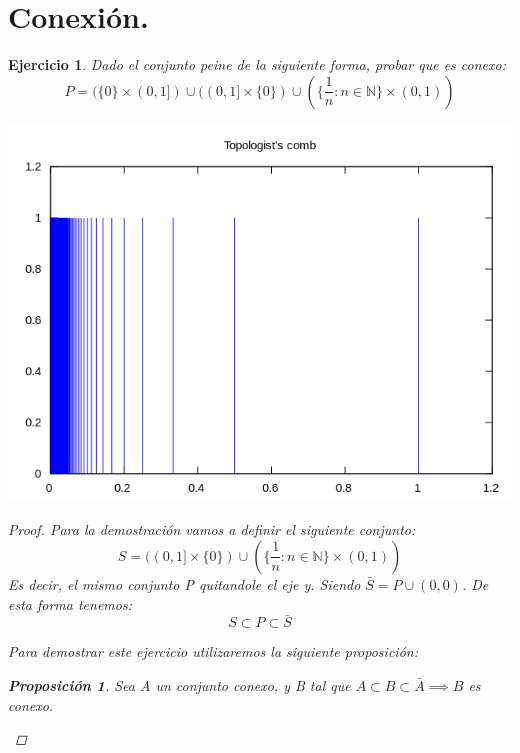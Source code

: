 \documentclass[11pt, a4paper, titlepage]{article}
\theoremstyle{exercise-style}
\newtheorem*{ejer}{Ejercicio}
\theoremstyle{theorem-style}
\newtheorem*{nprop}{Proposición}
\begin{document}
\section{Conexión.}
\begin{ejer} Dado el conjunto \emph{peine} de la siguiente forma, probar que es conexo:
\[
	P = (\{ 0\} \times (0,1]) \cup ((0,1] \times \{0\}) \cup (\{\frac{1}{n} : n \in \mathbb{N}\} \times (0,1)) 
\]

\begin{center}
\includegraphics[scale=0.4]{./img/peine.png}
\end{center}

\begin{proof}
Para la demostración vamos a definir el siguiente conjunto:
\[
	S = ((0,1] \times \{0\}) \cup (\{\frac{1}{n} : n \in \mathbb{N}\} \times (0,1)) 
\]
Es decir, el mismo conjunto P quitandole el eje y. Siendo $\bar{S} = P \cup (0,0)$.
De esta forma tenemos:
\[
S \subset P \subset \bar{S}
\]

Para demostrar este ejercicio utilizaremos la siguiente proposición:\\

\begin{nprop}
Sea A un conjunto conexo, y B tal que $A \subset B \subset \bar{A} \implies B$ es conexo.
\end{nprop}


\end{proof}
\end{ejer}
\end{document}
